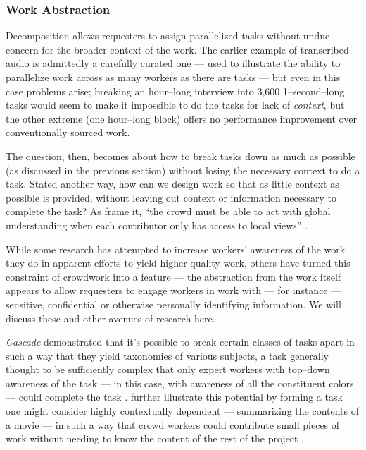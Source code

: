\documentclass[trackingWork]{subfiles}
\begin{document}
\subsubsection{Work Abstraction}\label{sec:Slicing}
Decomposition allows requesters to assign parallelized tasks
without undue concern for the broader context of the work.
The earlier example of transcribed audio is admittedly a carefully curated one
--- used to illustrate the ability
to parallelize work across as many workers as there are tasks ---
but even in this case problems arise;
breaking an hour--long interview into
3,600 1--second--long tasks would seem to make it impossible to do the tasks
for lack of \textit{context},
but the other extreme (one hour--long block)
offers no performance improvement over conventionally sourced work.

The question, then, becomes about how to break tasks down as much as possible
(as discussed in the previous section)
without losing the necessary context to do a task.
Stated another way, how can we design work so that as little context as possible is provided,
without leaving out context or information necessary to complete the task?
As \citeauthor{verroios2014context} frame it,
``the crowd must be able to act with
global understanding when each contributor only has access to local views''
\cite{verroios2014context}.

While some research has attempted to increase workers' awareness of the work they do in
apparent efforts to yield higher quality work,
others have turned this constraint of crowdwork into a feature ---
the abstraction from the work itself
appears to allow requesters to engage workers in work with ---
for instance ---
sensitive, confidential or otherwise personally identifying information.
We will discuss these and other avenues of research here.

\textit{Cascade} demonstrated that it's possible to
break certain classes of tasks apart
in such a way that they yield taxonomies of various subjects,
a task generally thought to be sufficiently complex that only expert workers
with top--down awareness of the task
--- in this case, with awareness of all the constituent colors ---
could complete the task
\cite{chilton2013cascade}.
\citeauthor{verroios2014context} further illustrate this potential by
forming a task one might consider highly contextually dependent
--- summarizing the contents of a movie ---
in such a way that crowd workers could contribute small pieces of work without
needing to know the content of the rest of the project
\cite{verroios2014context}.
\end{document}
